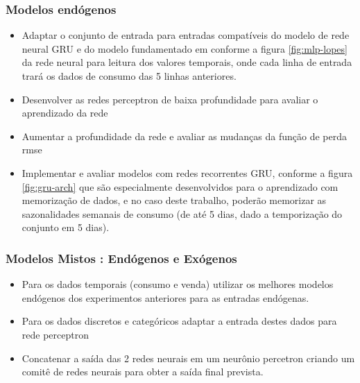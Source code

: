 \documentclass[	12pt, Times, openright, twoside, a4paper, english, brazil]{abntex2}
\begin{document}
         	\subsubsection{Modelos endógenos}
         	\begin{itemize}
             	\item   Adaptar o conjunto de entrada para entradas compatíveis do modelo de rede neural GRU e do modelo fundamentado em \cite{Lopes2008} conforme a figura \ref{fig:mlp-lopes} da rede neural para leitura dos valores temporais, onde cada linha de entrada trará os dados de consumo das 5 linhas anteriores.
                \item	Desenvolver as redes perceptron de baixa profundidade para avaliar o aprendizado da rede
                \item	Aumentar a profundidade da rede e avaliar as mudanças da função de perda rmse
                \item	Implementar e avaliar modelos com redes recorrentes GRU, conforme a figura \ref{fig:gru-arch} que são especialmente desenvolvidos para o aprendizado com memorização de dados, e no caso deste trabalho, poderão memorizar as sazonalidades semanais de consumo (de até 5 dias, dado a temporização do conjunto em 5 dias).
            \end{itemize}
            \subsubsection{Modelos Mistos : Endógenos e Exógenos}
                \begin{itemize}
                    \item Para os dados temporais (consumo e venda) utilizar os melhores modelos endógenos dos experimentos anteriores para as entradas endógenas. 
                    \item Para os dados discretos e categóricos adaptar a entrada destes dados para rede perceptron
                    \item  Concatenar a saída das 2 redes neurais em um neurônio percetron criando um comitê de redes neurais para obter a saída final prevista.
                \end{itemize}
\end{document}
